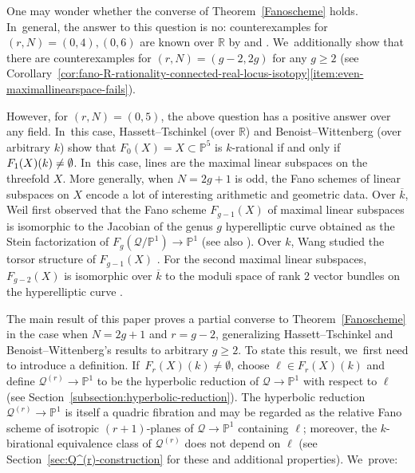 \documentclass[JEP,XML,SOM,Unicode,NoEqCountersInSection,published]{cedram}
\let\bb\mathbb\let\Bbb\mathbb
\theoremstyle{plain}
\theoremstyle{definition}
\newcommand{\kbar}{{\overline{k}}}
\renewcommand\P{\mathbb{P}}
\newcommand\R{\mathbb{R}}
\begin{document}
One may wonder whether the converse of Theorem~\ref{Fanoscheme} holds. In~general, the answer to this question is no: counterexamples for $(r,N)=(0, 4), (0, 6)$ are known over \(\bb R\) by \cite[Rem.\,37]{HT-intersection-quadrics} and \cite[Prop.\,6.1 \& 6.2]{HassettKoll'arTschinkel}. We~additionally show that there are counterexamples for \((r,N)=(g-2, 2g)\) for any \(g\geq 2\) (see Corollary~\ref{cor:fano-R-rationality-connected-real-locus-isotopy}\eqref{item:even-maximallinearspace-fails}).

However, for $(r,N)=(0,5)$, the above question has a positive answer over any field. In~this case, Hassett--Tschinkel (over $\R$) \cite{HT-intersection-quadrics} and Benoist--Wittenberg (over arbitrary $k$) \cite{BW-IJ} show that \(F_0(X) = X \subset \bb P^5\) is \(k\)-rational if and only if \(F_1(X)(k)\neq\nobreak\emptyset\). In~this case, lines are the maximal linear subspaces on the threefold \(X\). More generally, when \(N=2g+1\) is odd, the Fano schemes of linear subspaces on \(X\) encode a lot of interesting arithmetic and geometric data. Over \(\kbar\), Weil first observed that
the Fano scheme \(F_{g-1}(X)\) of maximal linear subspaces is isomorphic to the Jacobian of the genus \(g\) hyperelliptic curve obtained as the Stein factorization of $F_g(\mathcal{Q}/\P^1)\to\P^1$ \cite{Gauthier54} (see also \cite{Reid-thesis,Desale-Ramanan,Donagi80}).
Over \(k\), Wang studied the torsor structure of \(F_{g-1}(X)\) \cite{Wang-maximal-linear-spaces}. For the second maximal linear subspaces, \(F_{g-2}(X)\) is isomorphic over \(\kbar\) to the moduli space of rank 2 vector bundles on the hyperelliptic curve \cite{Desale-Ramanan}.

The main result of this paper
proves a partial converse to Theorem~\ref{Fanoscheme} in the case when \(N=2g+1\) and \(r=g-2\), generalizing Hassett--Tschinkel and Benoist--Wittenberg's results to arbitrary \(g \geq 2\).
To state this result, we~first need to introduce a definition. If~$F_{r}(X)(k)\neq\emptyset$, choose $\ell \in F_r(X)(k)$ and define $\mathcal{Q}^{(r)}\to \P^1$ to be the hyperbolic reduction of $\mathcal{Q}\to \P^1$ with respect to $\ell$ (see Section~\ref{subsection:hyperbolic-reduction}).
The hyperbolic reduction $\mathcal{Q}^{(r)}\to \P^1$ is itself a quadric fibration
and may be regarded as the relative Fano scheme of isotropic $(r+1)$-planes of $\mathcal{Q}\to \P^1$ containing $\ell$;
moreover, the $k$\nobreakdash-birational equivalence class of $\mathcal{Q}^{(r)}$ does not depend on $\ell$ (see Section~\ref{sec:Q^(r)-construction} for these and additional properties). We~prove:
\end{document}
